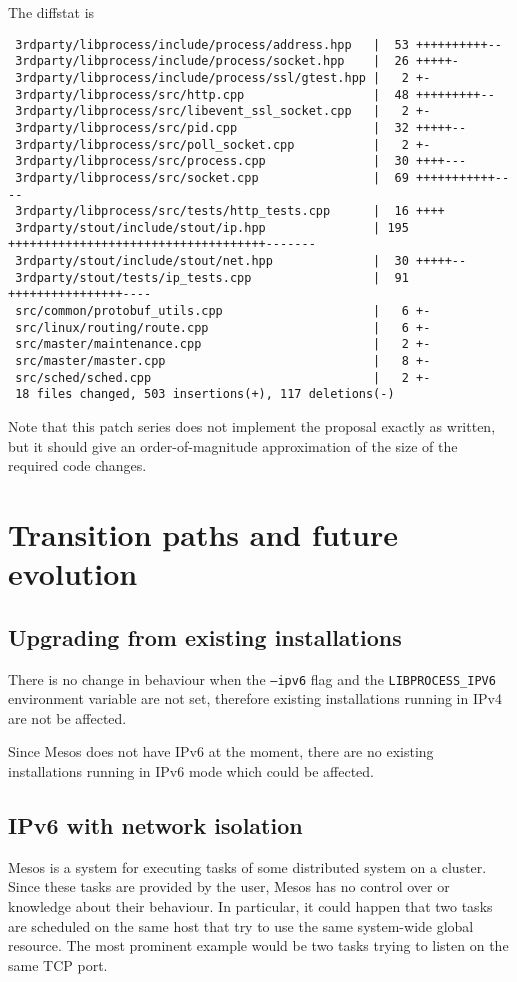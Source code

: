 \documentclass{scrreprt}
\begin{document}
The diffstat is

\begin{Verbatim}
 3rdparty/libprocess/include/process/address.hpp   |  53 ++++++++++--
 3rdparty/libprocess/include/process/socket.hpp    |  26 +++++-
 3rdparty/libprocess/include/process/ssl/gtest.hpp |   2 +-
 3rdparty/libprocess/src/http.cpp                  |  48 +++++++++--
 3rdparty/libprocess/src/libevent_ssl_socket.cpp   |   2 +-
 3rdparty/libprocess/src/pid.cpp                   |  32 +++++--
 3rdparty/libprocess/src/poll_socket.cpp           |   2 +-
 3rdparty/libprocess/src/process.cpp               |  30 ++++---
 3rdparty/libprocess/src/socket.cpp                |  69 +++++++++++----
 3rdparty/libprocess/src/tests/http_tests.cpp      |  16 ++++
 3rdparty/stout/include/stout/ip.hpp               | 195 ++++++++++++++++++++++++++++++++++++-------
 3rdparty/stout/include/stout/net.hpp              |  30 +++++--
 3rdparty/stout/tests/ip_tests.cpp                 |  91 ++++++++++++++++----
 src/common/protobuf_utils.cpp                     |   6 +-
 src/linux/routing/route.cpp                       |   6 +-
 src/master/maintenance.cpp                        |   2 +-
 src/master/master.cpp                             |   8 +-
 src/sched/sched.cpp                               |   2 +-
 18 files changed, 503 insertions(+), 117 deletions(-)
\end{Verbatim}

Note that this patch series does not implement the proposal exactly as written, but it should
give an order-of-magnitude approximation of the size of the required code changes.


\section{Transition paths and future evolution}
\subsection{Upgrading from existing installations}
There is no change in behaviour when the \texttt{--ipv6} flag and
the \texttt{LIBPROCESS\_IPV6} environment variable are not set,
therefore existing installations running in IPv4 are not be affected.

Since Mesos does not have IPv6 at the moment, there are no
existing installations running in IPv6 mode which could be affected.



\subsection{IPv6 with network isolation}
Mesos is a system for executing tasks of some distributed
system on a cluster. Since these tasks are provided by the user, Mesos has
no control over or knowledge about their behaviour.
In particular, it could happen that two tasks are scheduled on the same host
that try to use the same system-wide global resource. The most prominent example
would be two tasks trying to listen on the same TCP port.
\end{document}
